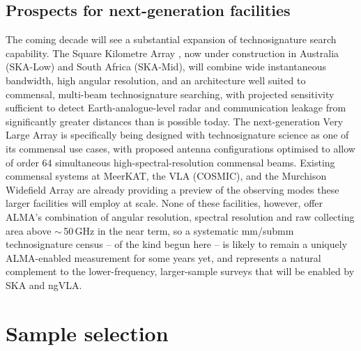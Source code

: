 \documentclass{openjournal}
\begin{document}
\subsection{Prospects for next-generation facilities}
\label{sec:future}

The coming decade will see a substantial expansion of technosignature search
capability. The Square Kilometre Array \citep[SKA;][]{SKA2015,SKA2026review},
now under construction in Australia (SKA-Low) and South Africa (SKA-Mid), will
combine wide instantaneous bandwidth, high angular resolution, and an
architecture well suited to commensal, multi-beam technosignature searching,
with projected sensitivity sufficient to detect Earth-analogue-level radar and
communication leakage from significantly greater distances than is possible
today. The next-generation Very Large Array \citep[ngVLA;][]{ngVLASETI2022} is
specifically being designed with technosignature science as one of its
commensal use cases, with proposed antenna configurations optimised to allow of
order 64 simultaneous high-spectral-resolution commensal beams. Existing
commensal systems at MeerKAT, the VLA (COSMIC), and the Murchison Widefield
Array are already providing a preview of the observing modes these larger
facilities will employ at scale. None of these facilities, however, offer ALMA's
combination of angular resolution, spectral resolution and raw collecting area
above $\sim$\,50\,GHz in the near term, so a systematic mm/submm technosignature
census -- of the kind begun here -- is likely to remain a uniquely ALMA-enabled
measurement for some years yet, and represents a natural complement to the
lower-frequency, larger-sample surveys that will be enabled by SKA and ngVLA.

\section{Sample selection}
\label{sec:sample}
\end{document}
